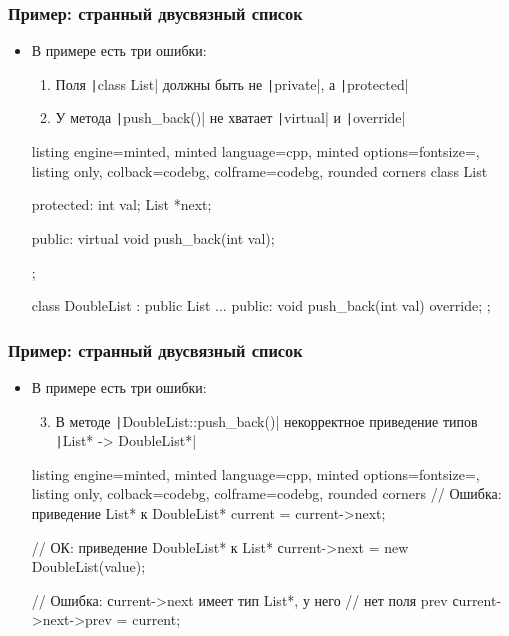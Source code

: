 \documentclass[10pt]{beamer}
\begin{document}
\begin{frame}[fragile]
\frametitle{Пример: странный двусвязный список}
\begin{itemize}
\item В примере есть три ошибки:
\pause
\begin{enumerate}
\item Поля \texttt|class List| должны быть не \texttt|private|, а \texttt|protected|
\pause
\item У метода \texttt|push_back()| не хватает \texttt|virtual| и \texttt|override|
\end{enumerate}
\pause
{}
\begin{tcblisting}{listing engine=minted, minted language=cpp, minted options={fontsize=\scriptsize}, listing only, colback=codebg, colframe=codebg, rounded corners}
class List {
protected:
  int val;
  List *next;

public:
  virtual void push_back(int val);
};

class DoubleList : public List {
...
public:
  void push_back(int val) override;
};
\end{tcblisting}
\end{itemize}
\end{frame}

\begin{frame}[fragile]
\frametitle{Пример: странный двусвязный список}
\begin{itemize}
\item В примере есть три ошибки:
\pause
\begin{enumerate}
\setcounter{enumi}{2}
\item В методе \texttt|DoubleList::push_back()| некорректное приведение типов \texttt|List* -> DoubleList*|
\end{enumerate}
\pause
{}
\begin{tcblisting}{listing engine=minted, minted language=cpp, minted options={fontsize=\scriptsize}, listing only, colback=codebg, colframe=codebg, rounded corners}
// Ошибка: приведение List* к DoubleList*
current = current->next;

// ОК: приведение DoubleList* к List*
сurrent->next = new DoubleList(value);

// Ошибка: сurrent->next имеет тип List*, у него
// нет поля prev
сurrent->next->prev = current;
\end{tcblisting}
\end{itemize}
\end{frame}
\end{document}
